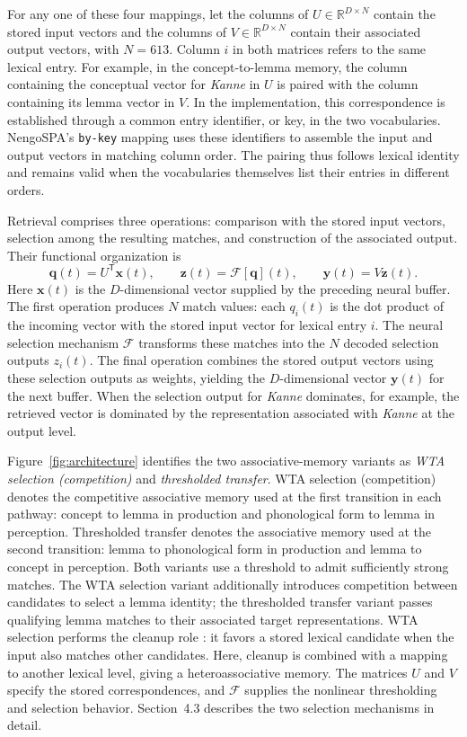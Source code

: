 For any one of these four mappings, let the columns of $U\in\mathbb R^{D\times N}$ contain the stored input vectors and the columns of $V\in\mathbb R^{D\times N}$ contain their associated output vectors, with $N=613$. Column $i$ in both matrices refers to the same lexical entry. For example, in the concept-to-lemma memory, the column containing the conceptual vector for \emph{Kanne} in $U$ is paired with the column containing its lemma vector in $V$. In the implementation, this correspondence is established through a common entry identifier, or key, in the two vocabularies. NengoSPA's \texttt{by-key} mapping uses these identifiers to assemble the input and output vectors in matching column order. The pairing thus follows lexical identity and remains valid when the vocabularies themselves list their entries in different orders.

Retrieval comprises three operations: comparison with the stored input vectors, selection among the resulting matches, and construction of the associated output. Their functional organization is
\begin{equation}
 \mathbf q(t)=U^{\mathsf T}\mathbf x(t),\qquad
 \mathbf z(t)=\mathcal F[\mathbf q](t),\qquad
 \mathbf y(t)=V\mathbf z(t).
 \label{eq:am}
\end{equation}
Here $\mathbf x(t)$ is the $D$-dimensional vector supplied by the preceding neural buffer. The first operation produces $N$ match values: each $q_i(t)$ is the dot product of the incoming vector with the stored input vector for lexical entry $i$. The neural selection mechanism $\mathcal F$ transforms these matches into the $N$ decoded selection outputs $z_i(t)$. The final operation combines the stored output vectors using these selection outputs as weights, yielding the $D$-dimensional vector $\mathbf y(t)$ for the next buffer. When the selection output for \emph{Kanne} dominates, for example, the retrieved vector is dominated by the representation associated with \emph{Kanne} at the output level.

Figure~\ref{fig:architecture} identifies the two associative-memory variants as \emph{WTA selection (competition)} and \emph{thresholded transfer}. WTA selection (competition) denotes the competitive associative memory used at the first transition in each pathway: concept to lemma in production and phonological form to lemma in perception. Thresholded transfer denotes the associative memory used at the second transition: lemma to phonological form in production and lemma to concept in perception. Both variants use a threshold to admit sufficiently strong matches. The WTA selection variant additionally introduces competition between candidates to select a lemma identity; the thresholded transfer variant passes qualifying lemma matches to their associated target representations. WTA selection performs the cleanup role \citep{stewart2011}: it favors a stored lexical candidate when the input also matches other candidates. Here, cleanup is combined with a mapping to another lexical level, giving a heteroassociative memory. The matrices $U$ and $V$ specify the stored correspondences, and $\mathcal F$ supplies the nonlinear thresholding and selection behavior. Section~4.3 describes the two selection mechanisms in detail.

